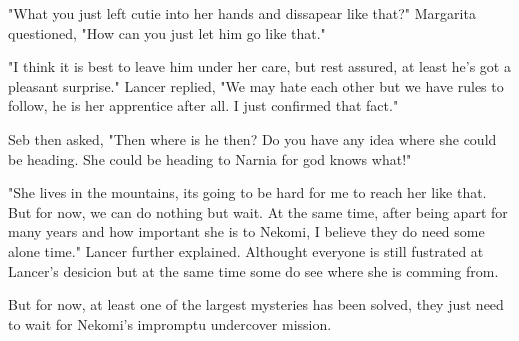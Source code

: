 "What you just left cutie into her hands and dissapear like that?" Margarita questioned, "How can you just let him go like that."

"I think it is best to leave him under her care, but rest assured, at least he's got a pleasant surprise." Lancer replied, "We may hate each other but we have rules to follow, he is her apprentice after all. I just confirmed that fact."

Seb then asked, "Then where is he then? Do you have any idea where she could be heading. She could be heading to Narnia for god knows what!"

"She lives in the mountains, its going to be hard for me to reach her like that. But for now, we can do nothing but wait. At the same time, after being apart for many years and how important she is to Nekomi, I believe they do need some alone time." Lancer further explained. Althought everyone is still fustrated at Lancer's desicion but at the same time some do see where she is comming from.

But for now, at least one of the largest mysteries has been solved, they just need to wait for Nekomi's impromptu undercover mission.